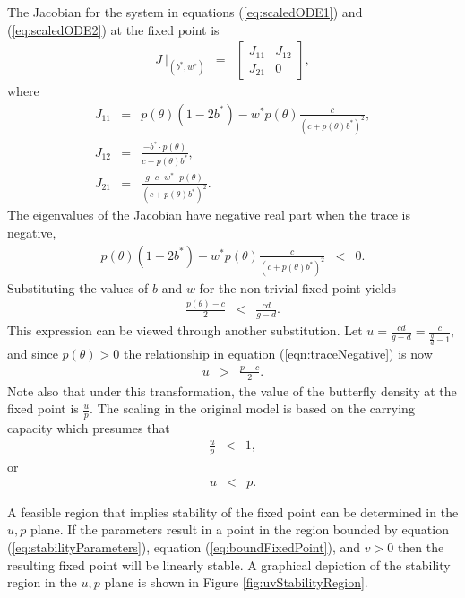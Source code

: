 \documentclass[review]{elsarticle}
\begin{document}
The Jacobian for the system in equations (\ref{eq:scaledODE1}) and
(\ref{eq:scaledODE2}) at the fixed point is
\begin{eqnarray}
  J ~ \bigg|_{(b^*,w^*)} & = &
          \left[
          \begin{array}{rr}
            J_{11} & J_{12} \\
            J_{21} & 0
          \end{array}
          \right],
\end{eqnarray}
where
\begin{eqnarray}
  \label{eq:jacobian}
  J_{11} & = & p(\theta)(1-2b^*) - w^* p(\theta)\frac{c}{(c+p(\theta)b^*)^2}, \\
  J_{12} & = & \frac{-b^*\cdot p(\theta)}{c+p(\theta)b^*}, \\
  J_{21} & = & \frac{g\cdot c \cdot w^* \cdot p(\theta)}{(c+p(\theta)b^*)^2}.
\end{eqnarray}
The eigenvalues of the Jacobian have negative real part when the
trace is negative,
\begin{eqnarray}
  p(\theta)(1-2b^*) - w^* p(\theta)\frac{c}{(c+p(\theta)b^*)^2} & < & 0.
\end{eqnarray}
Substituting the values of $b$ and $w$ for the non-trivial fixed point
yields
\begin{eqnarray}
  \label{eqn:traceNegative}
  \frac{p(\theta)-c}{2} & < & \frac{cd}{g-d}.
\end{eqnarray}
This expression can be viewed through another substitution. Let
$u=\frac{cd}{g-d}=\frac{c}{\frac{g}{d}-1}$, and since
$p(\theta)>0$ the relationship in equation
(\ref{eqn:traceNegative}) is now
\begin{eqnarray}
  \label{eq:stabilityParameters}
  u & > & \frac{p-c}{2}.
\end{eqnarray}
Note also that under this transformation, the value of the butterfly
density at the fixed point is $\frac{u}{p}$. The scaling in the
original model is based on the carrying capacity which presumes that
\begin{eqnarray}
  \frac{u}{p} & < & 1,
\end{eqnarray}
or 
\begin{eqnarray}
  \label{eq:boundFixedPoint}
  u & < & p.
\end{eqnarray}

A feasible region that implies stability of the fixed point can be
determined in the $u,p$ plane. If the parameters result in a point in
the region bounded by equation (\ref{eq:stabilityParameters}),
equation (\ref{eq:boundFixedPoint}), and $v>0$ then the resulting
fixed point will be linearly stable. A graphical depiction of the
stability region in the $u,p$ plane is shown in Figure
\ref{fig:uvStabilityRegion}.
\end{document}
